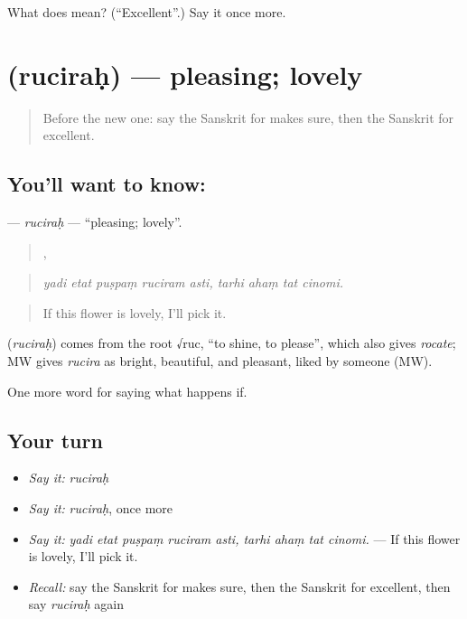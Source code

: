 \begin{tcolorbox}[breakable,colback=teal!4,colframe=teal!35!black,title={Before you move on}]
What does  mean? (\textquotedblleft{}Excellent\textquotedblright{}.) Say it once more.
\end{tcolorbox}
\section[\texorpdfstring{\sk{रुचिरः} (ruciraḥ)}{रुचिरः (ruciraḥ)}]{ (ruciraḥ) — pleasing; lovely}

\label{lesson:SA-C542-rucirah}



\begin{quote}
Before the new one: say the Sanskrit for makes sure, then the Sanskrit for excellent.
\end{quote}

\subsection*{You'll want to know: }
\textbf{} — \emph{ruciraḥ} — \textquotedblleft{}pleasing; lovely\textquotedblright{}.

\begin{quote}
    ,    
\end{quote}

\begin{quote}
\emph{yadi etat puṣpaṃ ruciram asti, tarhi ahaṃ tat cinomi.}
\end{quote}

\begin{quote}
If this flower is lovely, I'll pick it.
\end{quote}

\begin{cousinweb}
\textbf{} (\emph{ruciraḥ}) comes from the root √ruc, \textquotedblleft{}to shine, to please\textquotedblright{}, which also gives \emph{rocate}; MW gives \emph{rucira} as bright, beautiful, and pleasant, liked by someone (MW).
\end{cousinweb}

\begin{grammarlens}[title={What you've built}]
One more word for saying what happens if.
\end{grammarlens}

\subsection*{Your turn}
\begin{itemize}
\raggedright
  \item \emph{Say it:} \emph{ruciraḥ}
  \item \emph{Say it:} \emph{ruciraḥ}, once more
  \item \emph{Say it:} \emph{yadi etat puṣpaṃ ruciram asti, tarhi ahaṃ tat cinomi.} — If this flower is lovely, I'll pick it.
  \item \emph{Recall:} say the Sanskrit for makes sure, then the Sanskrit for excellent, then say \emph{ruciraḥ} again
\end{itemize}

